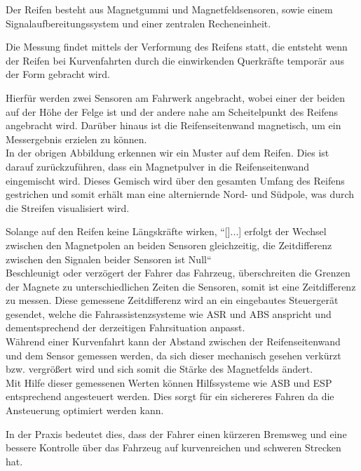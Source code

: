\begin{flushleft}
	                Der Reifen besteht aus Magnetgummi und Magnetfeldsensoren, sowie einem Signalaufbereitungssystem und einer zentralen Recheneinheit.
						
	                Die Messung findet mittels der Verformung des Reifens statt, die entsteht wenn der Reifen bei Kurvenfahrten durch die einwirkenden Querkräfte temporär aus der Form gebracht wird. 
	                
	                Hierfür werden zwei Sensoren am Fahrwerk angebracht, wobei einer der beiden auf der Höhe der Felge ist und der andere nahe am Scheitelpunkt des Reifens angebracht wird. Darüber hinaus ist die Reifenseitenwand magnetisch, um ein Messergebnis erzielen zu können.\\
	                In der obrigen Abbildung erkennen wir ein Muster auf dem Reifen. Dies ist darauf zurückzuführen, dass ein Magnetpulver in die Reifenseitenwand eingemischt wird. Dieses Gemisch wird über den gesamten Umfang des Reifens gestrichen und somit erhält man eine alterniernde Nord- und Südpole, was durch die Streifen visualisiert wird.
	                
	                Solange auf den Reifen keine Längskräfte wirken, ``[]...] erfolgt der Wechsel zwischen den Magnetpolen an beiden Sensoren gleichzeitig, die Zeitdifferenz zwischen den Signalen beider Sensoren ist Null`` \cite{TS_swt} \\	
	                Beschleunigt oder verzögert der Fahrer das Fahrzeug, überschreiten die Grenzen der Magnete zu unterschiedlichen Zeiten die Sensoren, somit ist eine Zeitdifferenz zu messen. 
	                Diese gemessene Zeitdifferenz wird an ein eingebautes Steuergerät gesendet, welche die Fahrassistenzsysteme wie ASR und ABS anspricht und dementsprechend der derzeitigen Fahrsituation anpasst.\\
	                
					Während einer Kurvenfahrt kann der Abstand zwischen der Reifenseitenwand und dem Sensor gemessen werden, da sich dieser mechanisch gesehen verkürzt bzw. vergrößert wird und sich somit die Stärke des Magnetfelds ändert.\\
	                Mit Hilfe dieser gemessenen Werten können Hilfssysteme wie ASB und ESP entsprechend angesteuert werden. Dies sorgt für ein sichereres Fahren da die Ansteuerung optimiert werden kann. 
	                
	                In der Praxis bedeutet dies, dass der Fahrer einen kürzeren Bremsweg und eine bessere Kontrolle über das Fahrzeug auf kurvenreichen und schweren Strecken hat.
	

\end{flushleft}
